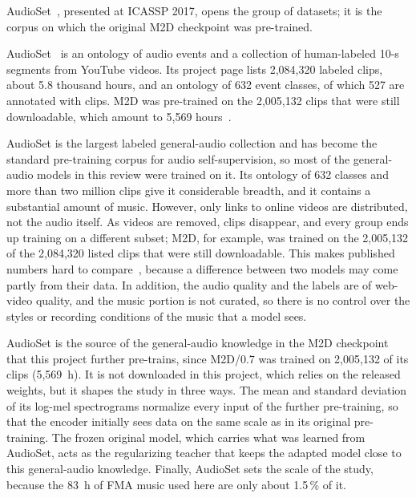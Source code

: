 \documentclass{FastFyp}
\begin{document}
AudioSet~\cite{ref:Gemmeke:2017audioset}, presented at ICASSP 2017, opens the group of datasets; it is the corpus on which the original M2D checkpoint was pre-trained.

\lrsummary
AudioSet~\cite{ref:Gemmeke:2017audioset} is an ontology of audio events and a collection of human-labeled 10-s segments from YouTube videos. Its project page lists 2,084,320 labeled clips, about 5.8 thousand hours, and an ontology of 632 event classes, of which 527 are annotated with clips. M2D was pre-trained on the 2,005,132 clips that were still downloadable, which amount to 5,569 hours~\cite{ref:Niizumi:2024m2dx}.

\lrcritical
AudioSet is the largest labeled general-audio collection and has become the standard pre-training corpus for audio self-supervision, so most of the general-audio models in this review were trained on it. Its ontology of 632 classes and more than two million clips give it considerable breadth, and it contains a substantial amount of music. However, only links to online videos are distributed, not the audio itself. As videos are removed, clips disappear, and every group ends up training on a different subset; M2D, for example, was trained on the 2,005,132 of the 2,084,320 listed clips that were still downloadable. This makes published numbers hard to compare~\cite{ref:Quelennec:2025matpacpp}, because a difference between two models may come partly from their data. In addition, the audio quality and the labels are of web-video quality, and the music portion is not curated, so there is no control over the styles or recording conditions of the music that a model sees.

\lrrelation
AudioSet is the source of the general-audio knowledge in the M2D checkpoint that this project further pre-trains, since M2D/0.7 was trained on 2,005,132 of its clips (5,569~h). It is not downloaded in this project, which relies on the released weights, but it shapes the study in three ways. The mean and standard deviation of its log-mel spectrograms normalize every input of the further pre-training, so that the encoder initially sees data on the same scale as in its original pre-training. The frozen original model, which carries what was learned from AudioSet, acts as the regularizing teacher that keeps the adapted model close to this general-audio knowledge. Finally, AudioSet sets the scale of the study, because the 83~h of FMA music used here are only about 1.5\,\% of it.
\end{document}
